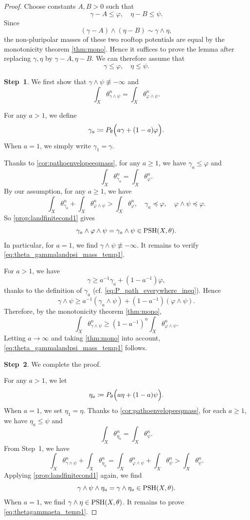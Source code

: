 \begin{proof}
    Choose constants $A,B>0$ such that
    \[
        \gamma-A\leq \varphi,\quad \eta-B\leq \psi.
    \]
    Since
    \[
        (\gamma-A)\land(\eta-B)\sim \gamma\land\eta,
    \]
    the non-pluripolar masses of these two rooftop potentials are equal by the monotonicity theorem \cref{thm:mono}. Hence it suffices to prove the lemma after replacing $\gamma,\eta$ by $\gamma-A,\eta-B$. We can therefore assume that
    \[
        \gamma\leq \varphi,\quad \eta\leq \psi.
    \]

    \textbf{Step~1}. We first show that $\gamma\land \psi\not\equiv -\infty$ and
    \begin{equation}\label{eq:theta_gammalandpsi_mass_temp1}
    \int_X \theta_{\gamma\land \psi}^n=\int_X \theta_{\varphi\land \psi}^n.
    \end{equation}

    For any $a>1$, we define
    \[
    \gamma_a\coloneqq P_{\theta}\Bigl( a\gamma+(1-a)\varphi \Bigr).
    \]
    When $a=1$, we simply write $\gamma_1=\gamma$.

    Thanks to \cref{cor:pathoenvelopeeqmass}, for any $a\geq 1$, we have $\gamma_a\leq \varphi$ and
    \[
    \int_X \theta_{\gamma_a}^n=\int_X \theta_{\varphi}^n.
    \]
    By our assumption, for any $a\geq 1$, we have
    \[
    \int_X \theta_{\gamma_a}^n+\int_X \theta_{\varphi\land \psi}^n> \int_X \theta_{\varphi}^n,\quad \gamma_a\preceq \varphi,\quad \varphi\land \psi\preceq \varphi.
    \]
    So \cref{prop:landfinitecond1} gives
    \[
    \gamma_a\land \varphi\land \psi=\gamma_a\land \psi\in \mathrm{PSH}(X,\theta).
    \]
    In particular, for $a=1$, we find $\gamma\land \psi\not\equiv -\infty$. It remains to verify \eqref{eq:theta_gammalandpsi_mass_temp1}.

    For $a>1$, we have
    \[
    \gamma\geq a^{-1}\gamma_a+\left(1-a^{-1}\right)\varphi,
    \]
    thanks to the definition of $\gamma_a$ (cf. \eqref{eq:P_path_everywhere_ineq}). Hence
    \[
    \gamma\land \psi\geq a^{-1}\left( \gamma_a\land \psi\right)+\left(1-a^{-1}\right)\left(\varphi\land \psi\right).
    \]
    Therefore, by the monotonicity theorem \cref{thm:mono},
    \[
    \int_X \theta_{\gamma\land \psi}^n\geq \left(1-a^{-1}\right)^n \int_X \theta_{\varphi\land \psi}^n.
    \]
    Letting $a\to \infty$ and taking \cref{thm:mono} into account, \eqref{eq:theta_gammalandpsi_mass_temp1} follows.

    \textbf{Step~2}. We complete the proof.

    For any $a>1$, we let
    \[
    \eta_a\coloneqq P_{\theta}\Bigl( a\eta+(1-a)\psi \Bigr).
    \]
    When $a=1$, we set $\eta_1=\eta$.
    Thanks to \cref{cor:pathoenvelopeeqmass}, for each $a\geq 1$, we have $\eta_a\leq \psi$ and
    \[
    \int_X \theta_{\eta_a}^n=\int_X \theta_{\psi}^n.
    \]
    From Step~1, we have
    \[
    \int_X \theta_{\gamma\land\psi}^n+\int_X \theta_{\eta_a}^n=\int_X \theta_{\varphi\land \psi}^n+\int_X \theta_{\psi}^n>\int_X \theta_{\psi}^n.
    \]
    Applying \cref{prop:landfinitecond1} again, we find
    \[
    \gamma\land\psi\land \eta_a =\gamma\land \eta_a\in \mathrm{PSH}(X,\theta).
    \]
    When $a=1$, we find $\gamma\land \eta\in \mathrm{PSH}(X,\theta)$. It remains to prove \eqref{eq:thetagammaeta_temp1}.


\end{proof}
